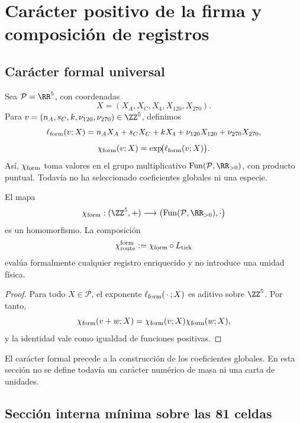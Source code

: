 \chapter{Carácter positivo de la firma y composición de registros}
\section{Carácter formal universal}

Sea \(\mathcal P=\RR^5\), con coordenadas
\[
 X=(X_A,X_C,X_4,X_{120},X_{270}).
\]
Para \(v=(n_A,s_C,k,\nu_{120},\nu_{270})\in\ZZ^5\), definimos
\[
 \ell_{\rm form}(v;X)
 =n_AX_A+s_CX_C+kX_4
  +\nu_{120}X_{120}+\nu_{270}X_{270},
\]
\[
 \chi_{\rm form}(v;X)=\exp\!\bigl(\ell_{\rm form}(v;X)\bigr).
\]
Así, \(\chi_{\rm form}\) toma valores en el grupo multiplicativo
\(\operatorname{Fun}(\mathcal P,\RR_{>0})\), con producto puntual. Todavía no
ha seleccionado coeficientes globales ni una especie.

\begin{theorem}
\label{thm:caracter-formal-ruta}
El mapa
\[
 \chi_{\rm form}:(\ZZ^5,+)\longrightarrow
 \bigl(\operatorname{Fun}(\mathcal P,\RR_{>0}),\cdot\bigr)
\]
es un homomorfismo. La composición
\[
 \chi_{\rm route}^{\rm form}
 :=\chi_{\rm form}\circ L_{\rm tick}
\]
evalúa formalmente cualquier registro enriquecido y no introduce una unidad
física.
\end{theorem}

\begin{proof}
Para todo \(X\in\mathcal P\), el exponente
\(\ell_{\rm form}(\,\cdot\,;X)\) es aditivo sobre \(\ZZ^5\). Por tanto,
\[
\chi_{\rm form}(v+w;X)
=\chi_{\rm form}(v;X)\chi_{\rm form}(w;X),
\]
y la identidad vale como igualdad de funciones positivas.
\end{proof}

El carácter formal precede a la construcción de los coeficientes globales.
En esta sección no se define todavía un carácter numérico de masa ni una
carta de unidades.

\section{Sección interna mínima sobre las 81 celdas}


